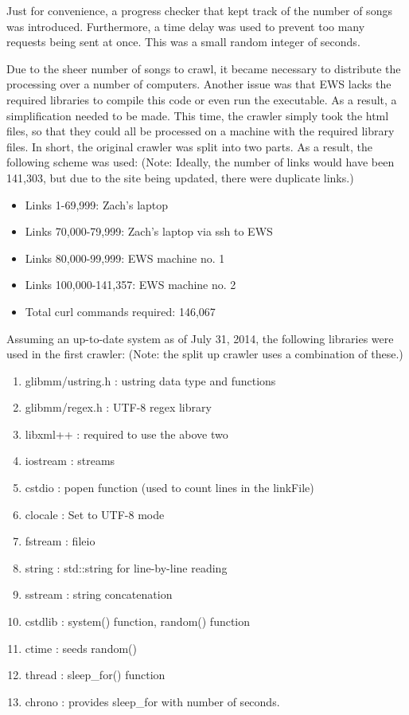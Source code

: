 \documentclass{acm} %
\begin{document}
\begin{CJK}{UTF8}{zhsong}
Just for convenience, a progress checker that kept track of the number of songs was introduced. Furthermore, a time delay was used to prevent too many requests being sent at once. This was a small random integer of seconds.

Due to the sheer number of songs to crawl, it became necessary to distribute the processing over a number of computers. Another issue was that EWS lacks the required libraries to compile this code or even run the executable. As a result, a simplification needed to be made. This time, the crawler simply took the html files, so that they could all be processed on a machine with the required library files. In short, the original crawler was split into two parts. As a result, the following scheme was used: (Note: Ideally, the number of links would have been 141,303, but due to the site being updated, there were duplicate links.)

\begin{itemize}
 \item Links 1-69,999: Zach's laptop
 \item Links 70,000-79,999: Zach's laptop via ssh to EWS
 \item Links 80,000-99,999: EWS machine no. 1
 \item Links 100,000-141,357: EWS machine no. 2
 \item Total curl commands required: 146,067
\end{itemize}

Assuming an up-to-date system as of July 31, 2014, the following libraries were used in the first crawler: (Note: the split up crawler uses a combination of these.)

\begin{enumerate}
 \item glibmm/ustring.h : ustring data type and functions
 \item glibmm/regex.h : UTF-8 regex library
 \item libxml++ : required to use the above two
 \item iostream : streams
 \item cstdio : popen function (used to count lines in the linkFile)
 \item clocale : Set to UTF-8 mode
 \item fstream : fileio
 \item string : std::string for line-by-line reading
 \item sstream : string concatenation
 \item cstdlib : system() function, random() function
 \item ctime : seeds random()
 \item thread : sleep\_for() function
 \item chrono : provides sleep\_for with number of seconds.
\end{enumerate}


\end{CJK}
\end{document}
